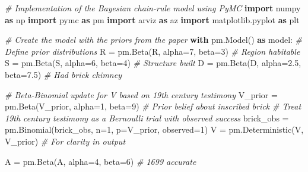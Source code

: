 \documentclass[
  11pt,
]{article}
\newenvironment{Shaded}{}{}
\newcommand{\CommentTok}[1]{\textcolor[rgb]{0.38,0.63,0.69}{\textit{#1}}}
\newcommand{\ControlFlowTok}[1]{\textcolor[rgb]{0.00,0.44,0.13}{\textbf{#1}}}
\newcommand{\DecValTok}[1]{\textcolor[rgb]{0.25,0.63,0.44}{#1}}
\newcommand{\FloatTok}[1]{\textcolor[rgb]{0.25,0.63,0.44}{#1}}
\newcommand{\ImportTok}[1]{\textcolor[rgb]{0.00,0.50,0.00}{\textbf{#1}}}
\newcommand{\NormalTok}[1]{#1}
\newcommand{\OperatorTok}[1]{\textcolor[rgb]{0.40,0.40,0.40}{#1}}
\newcommand{\StringTok}[1]{\textcolor[rgb]{0.25,0.44,0.63}{#1}}
\begin{document}
\begin{Shaded}
\begin{Highlighting}[]
\CommentTok{\# Implementation of the Bayesian chain{-}rule model using PyMC}
\ImportTok{import}\NormalTok{ numpy }\ImportTok{as}\NormalTok{ np}
\ImportTok{import}\NormalTok{ pymc }\ImportTok{as}\NormalTok{ pm}
\ImportTok{import}\NormalTok{ arviz }\ImportTok{as}\NormalTok{ az}
\ImportTok{import}\NormalTok{ matplotlib.pyplot }\ImportTok{as}\NormalTok{ plt}

\CommentTok{\# Create the model with the priors from the paper}
\ControlFlowTok{with}\NormalTok{ pm.Model() }\ImportTok{as}\NormalTok{ model:}
    \CommentTok{\# Define prior distributions}
\NormalTok{    R }\OperatorTok{=}\NormalTok{ pm.Beta(}\StringTok{\textquotesingle{}R\textquotesingle{}}\NormalTok{, alpha}\OperatorTok{=}\DecValTok{7}\NormalTok{, beta}\OperatorTok{=}\DecValTok{3}\NormalTok{)         }\CommentTok{\# Region habitable}
\NormalTok{    S }\OperatorTok{=}\NormalTok{ pm.Beta(}\StringTok{\textquotesingle{}S\textquotesingle{}}\NormalTok{, alpha}\OperatorTok{=}\DecValTok{6}\NormalTok{, beta}\OperatorTok{=}\DecValTok{4}\NormalTok{)         }\CommentTok{\# Structure built}
\NormalTok{    D }\OperatorTok{=}\NormalTok{ pm.Beta(}\StringTok{\textquotesingle{}D\textquotesingle{}}\NormalTok{, alpha}\OperatorTok{=}\FloatTok{2.5}\NormalTok{, beta}\OperatorTok{=}\FloatTok{7.5}\NormalTok{)     }\CommentTok{\# Had brick chimney}
    
    \CommentTok{\# Beta{-}Binomial update for V based on 19th century testimony}
\NormalTok{    V\_prior }\OperatorTok{=}\NormalTok{ pm.Beta(}\StringTok{\textquotesingle{}V\_prior\textquotesingle{}}\NormalTok{, alpha}\OperatorTok{=}\DecValTok{1}\NormalTok{, beta}\OperatorTok{=}\DecValTok{9}\NormalTok{)  }\CommentTok{\# Prior belief about inscribed brick}
    \CommentTok{\# Treat 19th century testimony as a Bernoulli trial with observed success}
\NormalTok{    brick\_obs }\OperatorTok{=}\NormalTok{ pm.Binomial(}\StringTok{\textquotesingle{}brick\_obs\textquotesingle{}}\NormalTok{, n}\OperatorTok{=}\DecValTok{1}\NormalTok{, p}\OperatorTok{=}\NormalTok{V\_prior, observed}\OperatorTok{=}\DecValTok{1}\NormalTok{)}
\NormalTok{    V }\OperatorTok{=}\NormalTok{ pm.Deterministic(}\StringTok{\textquotesingle{}V\textquotesingle{}}\NormalTok{, V\_prior)  }\CommentTok{\# For clarity in output}
    
\NormalTok{    A }\OperatorTok{=}\NormalTok{ pm.Beta(}\StringTok{\textquotesingle{}A\textquotesingle{}}\NormalTok{, alpha}\OperatorTok{=}\DecValTok{4}\NormalTok{, beta}\OperatorTok{=}\DecValTok{6}\NormalTok{)         }\CommentTok{\# 1699 accurate}
    

\end{Highlighting}
\end{Shaded}
\end{document}
